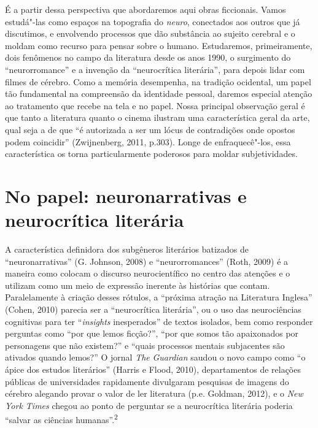 É a partir dessa perspectiva que abordaremos aqui obras ficcionais.
Vamos estudá"-las como espaços na topografia do \emph{neuro}, conectados
aos outros que já discutimos, e envolvendo processos que dão substância
ao sujeito cerebral e o moldam como recurso para pensar sobre o humano.
Estudaremos, primeiramente, dois fenômenos no campo da literatura desde
os anos 1990, o surgimento do ``neurorromance'' e a invenção da
``neurocrítica literária'', para depois lidar com filmes de cérebro.
Como a memória desempenha, na tradição ocidental, um papel tão
fundamental na compreensão da identidade pessoal, daremos especial
atenção ao tratamento que recebe na tela e no papel. Nossa principal
observação geral é que tanto a literatura quanto o cinema ilustram uma
característica geral da arte, qual seja a de que ``é autorizada a ser um
lócus de contradições onde opostos podem coincidir'' (Zwijnenberg, 2011,
p.303). Longe de enfraquecê"-los, essa característica os torna
particularmente poderosos para moldar subjetividades.

\chapter{No papel: neuronarrativas e neurocrítica literária}

A característica definidora dos subgêneros literários batizados de
``neuronarrativas'' (G. Johnson, 2008) e ``neurorromances'' (Roth, 2009)
é a maneira como colocam o discurso neurocientífico no centro das
atenções e o utilizam como um meio de expressão inerente às histórias
que contam. Paralelamente à criação desses rótulos, a ``próxima atração
na Literatura Inglesa'' (Cohen, 2010) parecia ser a ``neurocrítica
literária'', ou o uso das neurociências cognitivas para ter
``\emph{insights} inesperados'' de textos isolados, bem como responder
perguntas como ``por que lemos ficção?'', ``por que somos tão
apaixonados por personagens que não existem?'' e ``quais processos
mentais subjacentes são ativados quando lemos?'' O jornal \emph{The}
\emph{Guardian} saudou o novo campo como ``o ápice dos estudos
literários'' (Harris e Flood, 2010), departamentos de relações públicas
de universidades rapidamente divulgaram pesquisas de imagens do cérebro
alegando provar o valor de ler literatura (p.e. Goldman, 2012), e o
\emph{New York Times} chegou ao ponto de perguntar se a neurocrítica
literária poderia ``salvar as ciências humanas''.\textsuperscript{2}


